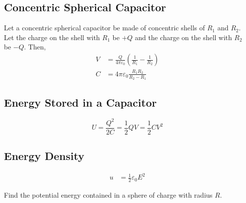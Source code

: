 \documentclass[fleqn, a4paper, 8pt, twoside]{amsart}
\theoremstyle{definition}
\theoremstyle{theorem}
\begin{document}
\begin{multicols}{2}
\begin{spacing}{0.6}
\subsection{Concentric Spherical Capacitor}

Let a concentric spherical capacitor be made of concentric shells of $R_1$ and $R_2$.
Let the charge on the shell with $R_1$ be $+Q$ and the charge on the shell with $R_2$ be $-Q$.
Then,
\begin{align*}
	V &= \frac{Q}{4 \pi \varepsilon_0} \left( \frac{1}{R_1} - \frac{1}{R_2} \right)\\
	C &= 4 \pi \varepsilon_0 \frac{R_1 R_2}{R_2 - R_1}
\end{align*}

\subsection{Energy Stored in a Capacitor}

\begin{equation*}
	U = \frac{Q^2}{2 C} = \frac{1}{2} Q V = \frac{1}{2} C V^2
\end{equation*}

\subsection{Energy Density}

\begin{align*}
	u & = \frac{1}{2} \varepsilon_0 E^2
\end{align*}

\begin{question}
	Find the potential energy contained in a sphere of charge with radius $R$.
\end{question}


\end{spacing}
\end{multicols}
\end{document}
